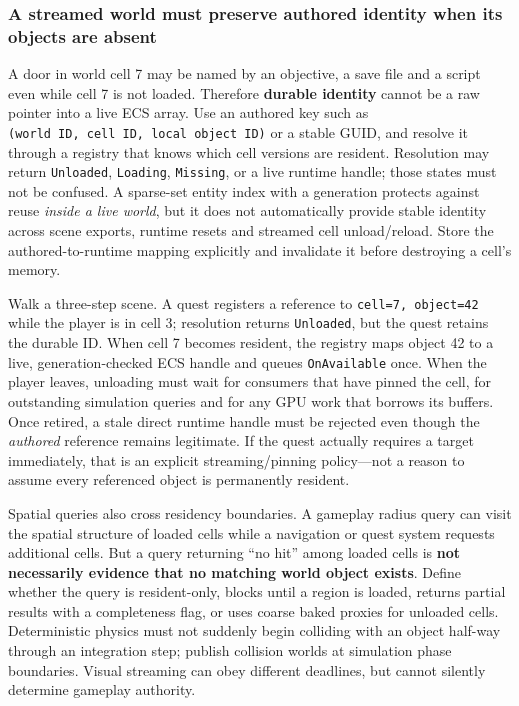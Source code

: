 \subsubsection{A streamed world must preserve authored identity when its objects are absent}\label{06-engine-ii-ch031-a-streamed-world-must-preserve-authored-identity-when-its-objects-are-absent}

A door in world cell 7 may be named by an objective, a save file and a script even while cell 7 is not loaded. Therefore \textbf{durable identity} cannot be a raw pointer into a live ECS array. Use an authored key such as \texttt{(world\ ID,\ cell\ ID,\ local\ object\ ID)} or a stable GUID, and resolve it through a registry that knows which cell versions are resident. Resolution may return \texttt{Unloaded}, \texttt{Loading}, \texttt{Missing}, or a live runtime handle; those states must not be confused. A sparse-set entity index with a generation protects against reuse \emph{inside a live world}, but it does not automatically provide stable identity across scene exports, runtime resets and streamed cell unload/reload. Store the authored-to-runtime mapping explicitly and invalidate it before destroying a cell's memory.

Walk a three-step scene. A quest registers a reference to \texttt{cell=7,\ object=42} while the player is in cell 3; resolution returns \texttt{Unloaded}, but the quest retains the durable ID. When cell 7 becomes resident, the registry maps object 42 to a live, generation-checked ECS handle and queues \texttt{OnAvailable} once. When the player leaves, unloading must wait for consumers that have pinned the cell, for outstanding simulation queries and for any GPU work that borrows its buffers. Once retired, a stale direct runtime handle must be rejected even though the \emph{authored} reference remains legitimate. If the quest actually requires a target immediately, that is an explicit streaming/pinning policy---not a reason to assume every referenced object is permanently resident.

Spatial queries also cross residency boundaries. A gameplay radius query can visit the spatial structure of loaded cells while a navigation or quest system requests additional cells. But a query returning ``no hit'' among loaded cells is \textbf{not necessarily evidence that no matching world object exists}. Define whether the query is resident-only, blocks until a region is loaded, returns partial results with a completeness flag, or uses coarse baked proxies for unloaded cells. Deterministic physics must not suddenly begin colliding with an object half-way through an integration step; publish collision worlds at simulation phase boundaries. Visual streaming can obey different deadlines, but cannot silently determine gameplay authority.

